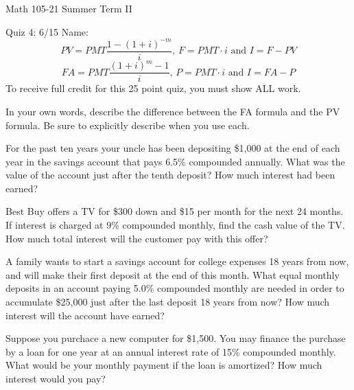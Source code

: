 \documentclass[11pt,epsfig]{article}
\begin{document}
Math 105-21 Summer Term II 

Quiz 4: 6/15 \hspace{1.9in} {Name:} {\underline {\hspace{3.5in}}}
\vspace{1pc}
\begin{equation*}
PV=PMT\frac{1-(1+i)^{-m}}{i} \mbox{, } F=PMT\cdot i \mbox{ and } I=F-PV
\end{equation*}
\begin{equation*}
FA=PMT\frac{(1+i)^{m}-1}{i} \mbox{, } P=PMT\cdot i \mbox{ and } I=FA-P
\end{equation*}
\vspace{1pc}
To receive full credit for this 25 point quiz, you must show ALL work.
\vspace{1pc}

\begin{problem}{5}
In your own words, describe the difference between the FA formula and the PV formula. Be sure to explicitly describe when you use each. 

\vfill
\end{problem}

\begin{problem}{5}
For the past ten years your uncle has been depositing \$1,000 at the end of each year in the savings account that pays 6.5\% compounded annually. What was the value of the account just after the tenth deposit? How much interest had been earned?

\vfill
\end{problem}

\newpage

\begin{problem}{5}
Best Buy offers a TV for \$300 down and \$15 per month for the next 24 months. If interest is charged at 9\% compounded monthly, find the cash value of the TV. How much total interest will the customer pay with this offer?

\vfill
\end{problem}

\begin{problem}{5}
A family wants to start a savings account for college expenses 18 years from now, and will make their first deposit at the end of this month. What equal monthly deposits in an account paying 5.0\% compounded monthly are needed in order to accumulate \$25,000 just after the last deposit 18 years from now? How much interest will the account have earned?  

\vfill
\end{problem}

\begin{problem}{5}
Suppose you purchace a new computer for \$1,500. You may finance the purchase by a loan for one year at an annual interest rate of 15\% compounded monthly. What would be your monthly payment if the loan is amortized? How much interest would you pay?

\vfill
\end{problem}

\showpoints
\end{document}
